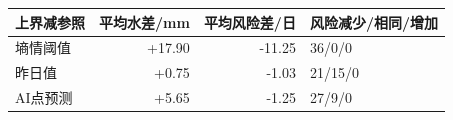 \begin{tabular}{lrrl}
\toprule
上界减参照 & 平均水差/mm & 平均风险差/日 & 风险减少/相同/增加 \\
\midrule
墒情阈值 & +17.90 & -11.25 & 36/0/0 \\
昨日值 & +0.75 & -1.03 & 21/15/0 \\
AI点预测 & +5.65 & -1.25 & 27/9/0 \\
\bottomrule
\end{tabular}